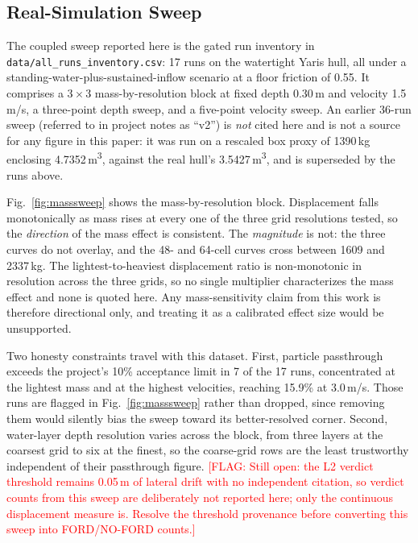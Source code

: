 \documentclass[conference]{IEEEtran}
\newcommand{\FLAG}[1]{\textcolor{red}{[FLAG: #1]}}
\begin{document}
\subsection{Real-Simulation Sweep}
The coupled sweep reported here is the gated run inventory in \texttt{data/all\_runs\_inventory.csv}: 17 runs on the watertight Yaris hull, all under a standing-water-plus-sustained-inflow scenario at a floor friction of 0.55. It comprises a 3\,$\times$\,3 mass-by-resolution block at fixed depth 0.30\,m and velocity 1.5\,m/s, a three-point depth sweep, and a five-point velocity sweep. An earlier 36-run sweep (referred to in project notes as ``v2'') is \emph{not} cited here and is not a source for any figure in this paper: it was run on a rescaled box proxy of 1390\,kg enclosing 4.7352\,m\textsuperscript{3}, against the real hull's 3.5427\,m\textsuperscript{3}, and is superseded by the runs above.

Fig.~\ref{fig:masssweep} shows the mass-by-resolution block. Displacement falls monotonically as mass rises at every one of the three grid resolutions tested, so the \emph{direction} of the mass effect is consistent. The \emph{magnitude} is not: the three curves do not overlay, and the 48- and 64-cell curves cross between 1609 and 2337\,kg. The lightest-to-heaviest displacement ratio is non-monotonic in resolution across the three grids, so no single multiplier characterizes the mass effect and none is quoted here. Any mass-sensitivity claim from this work is therefore directional only, and treating it as a calibrated effect size would be unsupported.

Two honesty constraints travel with this dataset. First, particle passthrough exceeds the project's 10\% acceptance limit in 7 of the 17 runs, concentrated at the lightest mass and at the highest velocities, reaching 15.9\% at 3.0\,m/s. Those runs are flagged in Fig.~\ref{fig:masssweep} rather than dropped, since removing them would silently bias the sweep toward its better-resolved corner. Second, water-layer depth resolution varies across the block, from three layers at the coarsest grid to six at the finest, so the coarse-grid rows are the least trustworthy independent of their passthrough figure. \FLAG{Still open: the L2 verdict threshold remains 0.05\,m of lateral drift with no independent citation, so verdict counts from this sweep are deliberately not reported here; only the continuous displacement measure is. Resolve the threshold provenance before converting this sweep into FORD/NO-FORD counts.}
\end{document}
